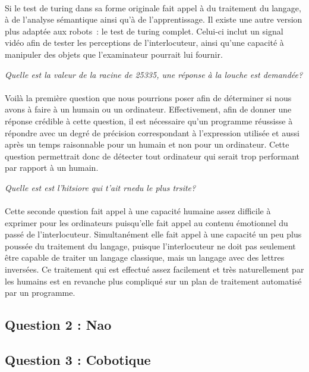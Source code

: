 \paragraph{}
Si le test de turing dans sa forme originale fait appel à du traitement du
langage, à de l'analyse sémantique ainsi qu'à de l'apprentissage. Il existe une
autre version plus adaptée aux robots~: le test de turing complet. Celui-ci
inclut un signal vidéo afin de tester les perceptions de l'interlocuteur, ainsi
qu'une capacité à manipuler des objets que l'examinateur pourrait lui fournir.

\begin{centering}
  {\em Quelle est la valeur de la racine de 25335, une réponse à la louche est
    demandée?}
\end{centering}

\paragraph{}
Voilà la première question que nous pourrions poser afin de déterminer si nous
avons à faire à un humain ou un ordinateur. Effectivement, afin de donner une
réponse crédible à cette question, il est nécessaire qu'un programme réussisse
à répondre avec un degré de précision correspondant à l'expression utilisée et
aussi après un temps raisonnable pour un humain et non pour un ordinateur. Cette
question permettrait donc de détecter tout ordinateur qui serait trop performant
par rapport à un humain.

\begin{centering}
  {\em Quelle est est l'hitsiore qui t'ait rnedu le plus trsite?}
\end{centering}

\paragraph{}
Cette seconde question fait appel à une capacité humaine assez difficile à
exprimer pour les ordinateurs puisqu'elle fait appel au contenu émotionnel du
passé de l'interlocuteur. Simultanément elle fait appel à une capacité un peu
plus poussée du traitement du langage, puisque l'interlocuteur ne doit pas
seulement être capable de traiter un langage classique, mais un langage avec des
lettres inversées. Ce traitement qui est effectué assez facilement et très
naturellement par les humains est en revanche plus compliqué sur un plan
de traitement automatisé par un programme.

\subsection{Question 2 : Nao}

\subsection{Question 3 : Cobotique}
